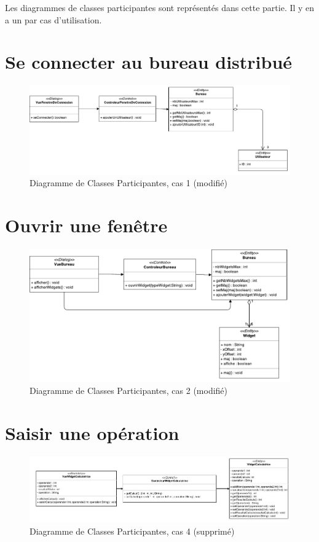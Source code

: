 Les diagrammes de classes participantes sont représentés dans cette partie. Il y en a un par cas d'utilisation.

\section{Se connecter au bureau distribué}

\noindent\begin{figure}[H]
	\centering
	\includegraphics[angle=90,scale=0.8]{diagrammes/DCP1.pdf}
	\caption{\color{green}Diagramme de Classes Participantes, cas 1 (modifié)\color{black}}
\end{figure}

\section{Ouvrir une fenêtre}

\begin{figure}[H]
	\centering
	\includegraphics[angle=90]{diagrammes/DCP2.pdf}
	\caption{\color{green}Diagramme de Classes Participantes, cas 2 (modifié)\color{black}}
\end{figure}

\section{Saisir une opération}
\noindent\begin{figure}[H]
	\centering
	\includegraphics[angle=90,scale=0.9]{diagrammes/DCP4.jpg}
	\caption{\color{red}Diagramme de Classes Participantes, cas 4 (supprimé)\color{black}}
\end{figure}


